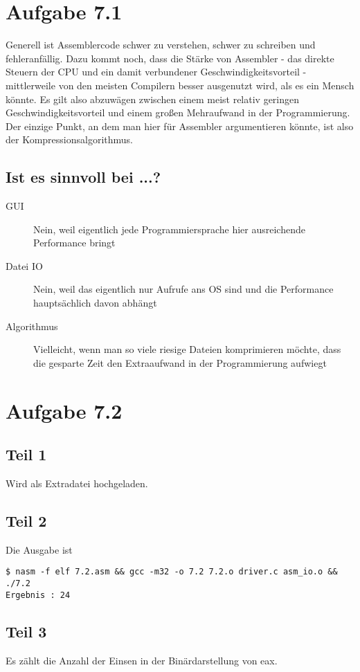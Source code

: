\documentclass[10pt,a4paper]{article}
\begin{document}
\section*{Aufgabe 7.1}

Generell ist Assemblercode schwer zu verstehen, schwer zu schreiben und fehleranfällig.
Dazu kommt noch, dass die Stärke von Assembler - das direkte Steuern der CPU und ein damit verbundener Geschwindigkeitsvorteil - mittlerweile von den meisten Compilern besser ausgenutzt wird, als es ein Mensch könnte.
Es gilt also abzuwägen zwischen einem meist relativ geringen Geschwindigkeitsvorteil und einem großen Mehraufwand in der Programmierung.
Der einzige Punkt, an dem man hier für Assembler argumentieren könnte, ist also der Kompressionsalgorithmus.

\subsection*{Ist es sinnvoll bei ...?}
\begin{description}
\item[GUI] Nein, weil eigentlich jede Programmiersprache hier ausreichende Performance bringt
\item[Datei IO] Nein, weil das eigentlich nur Aufrufe ans OS sind und die Performance hauptsächlich davon abhängt
\item[Algorithmus] Vielleicht, wenn man so viele riesige Dateien komprimieren möchte, dass die gesparte Zeit den Extraaufwand in der Programmierung aufwiegt
\end{description}

\section*{Aufgabe 7.2}

\subsection*{Teil 1}

Wird als Extradatei hochgeladen.

\subsection*{Teil 2}

Die Ausgabe ist

\begin{lstlisting}
$ nasm -f elf 7.2.asm && gcc -m32 -o 7.2 7.2.o driver.c asm_io.o && ./7.2
Ergebnis : 24
\end{lstlisting}

\subsection*{Teil 3}

Es zählt die Anzahl der Einsen in der Binärdarstellung von eax.
\end{document}
